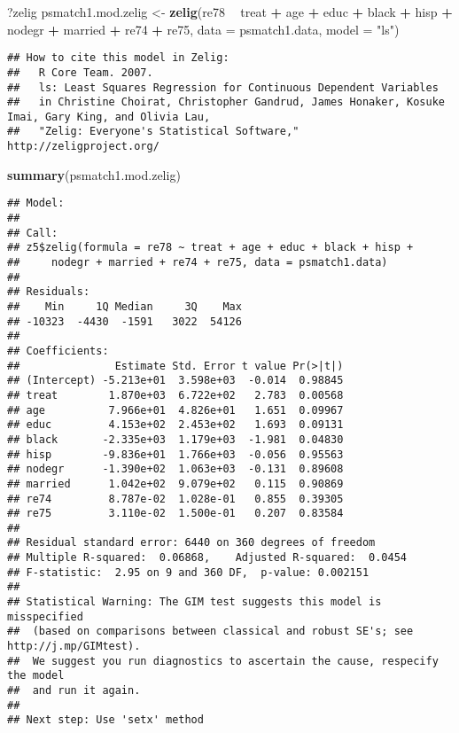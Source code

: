 \documentclass[]{article}
\newenvironment{Shaded}{\begin{snugshade}}{\end{snugshade}}
\newcommand{\DataTypeTok}[1]{\textcolor[rgb]{0.13,0.29,0.53}{#1}}
\newcommand{\KeywordTok}[1]{\textcolor[rgb]{0.13,0.29,0.53}{\textbf{#1}}}
\newcommand{\NormalTok}[1]{#1}
\newcommand{\OperatorTok}[1]{\textcolor[rgb]{0.81,0.36,0.00}{\textbf{#1}}}
\newcommand{\StringTok}[1]{\textcolor[rgb]{0.31,0.60,0.02}{#1}}
\begin{document}
\begin{Shaded}
\begin{Highlighting}[]
\NormalTok{?zelig}
\NormalTok{psmatch1.mod.zelig <-}\StringTok{ }\KeywordTok{zelig}\NormalTok{(re78 }\OperatorTok{~}\StringTok{ }\NormalTok{treat }\OperatorTok{+}\StringTok{ }\NormalTok{age }\OperatorTok{+}\StringTok{ }\NormalTok{educ }\OperatorTok{+}\StringTok{ }\NormalTok{black }\OperatorTok{+}\StringTok{ }\NormalTok{hisp }\OperatorTok{+}\StringTok{ }\NormalTok{nodegr }\OperatorTok{+}\StringTok{ }\NormalTok{married }\OperatorTok{+}\StringTok{ }\NormalTok{re74 }\OperatorTok{+}\StringTok{ }\NormalTok{re75,  }\DataTypeTok{data =}\NormalTok{ psmatch1.data,  }\DataTypeTok{model =} \StringTok{"ls"}\NormalTok{)}
\end{Highlighting}
\end{Shaded}

\begin{verbatim}
## How to cite this model in Zelig:
##   R Core Team. 2007.
##   ls: Least Squares Regression for Continuous Dependent Variables
##   in Christine Choirat, Christopher Gandrud, James Honaker, Kosuke Imai, Gary King, and Olivia Lau,
##   "Zelig: Everyone's Statistical Software," http://zeligproject.org/
\end{verbatim}

\begin{Shaded}
\begin{Highlighting}[]
\KeywordTok{summary}\NormalTok{(psmatch1.mod.zelig)}
\end{Highlighting}
\end{Shaded}

\begin{verbatim}
## Model: 
## 
## Call:
## z5$zelig(formula = re78 ~ treat + age + educ + black + hisp + 
##     nodegr + married + re74 + re75, data = psmatch1.data)
## 
## Residuals:
##    Min     1Q Median     3Q    Max 
## -10323  -4430  -1591   3022  54126 
## 
## Coefficients:
##               Estimate Std. Error t value Pr(>|t|)
## (Intercept) -5.213e+01  3.598e+03  -0.014  0.98845
## treat        1.870e+03  6.722e+02   2.783  0.00568
## age          7.966e+01  4.826e+01   1.651  0.09967
## educ         4.153e+02  2.453e+02   1.693  0.09131
## black       -2.335e+03  1.179e+03  -1.981  0.04830
## hisp        -9.836e+01  1.766e+03  -0.056  0.95563
## nodegr      -1.390e+02  1.063e+03  -0.131  0.89608
## married      1.042e+02  9.079e+02   0.115  0.90869
## re74         8.787e-02  1.028e-01   0.855  0.39305
## re75         3.110e-02  1.500e-01   0.207  0.83584
## 
## Residual standard error: 6440 on 360 degrees of freedom
## Multiple R-squared:  0.06868,    Adjusted R-squared:  0.0454 
## F-statistic:  2.95 on 9 and 360 DF,  p-value: 0.002151
## 
## Statistical Warning: The GIM test suggests this model is misspecified
##  (based on comparisons between classical and robust SE's; see http://j.mp/GIMtest).
##  We suggest you run diagnostics to ascertain the cause, respecify the model
##  and run it again.
## 
## Next step: Use 'setx' method
\end{verbatim}
\end{document}
